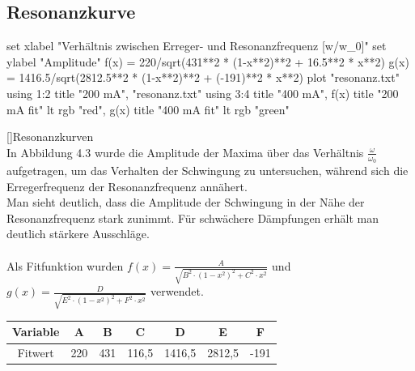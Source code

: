 \documentclass[12pt,a4paper,]{scrreprt}
\begin{document}
		\subsection{Resonanzkurve}
        
        \begin{gnuplot}[terminal=pdf,terminaloptions={font ",10" linewidth 3},scale=1.2]
        	set xlabel "Verhältnis zwischen Erreger- und Resonanzfrequenz [w/w_0]"
            set ylabel "Amplitude"
			f(x) = 220/sqrt(431**2 * (1-x**2)**2 + 16.5**2 * x**2)
            g(x) = 1416.5/sqrt(2812.5**2 * (1-x**2)**2 + (-191)**2 * x**2)
			plot "resonanz.txt" using 1:2 title "200 mA", "resonanz.txt" using 3:4 title "400 mA", f(x) title "200 mA fit" lt rgb "red", g(x) title "400 mA fit" lt rgb "green"
             
		\end{gnuplot}
        []{Resonanzkurven}
        \ \\
        In Abbildung 4.3 wurde die Amplitude der Maxima über das Verhältnis $\frac{\omega}{\omega_0}$ aufgetragen, um das Verhalten der Schwingung zu untersuchen, während sich die Erregerfrequenz der Resonanzfrequenz annähert.\\
        Man sieht deutlich, dass die Amplitude der Schwingung in der Nähe der Resonanzfrequenz stark zunimmt. Für schwächere Dämpfungen erhält man deutlich stärkere Ausschläge.\\
        \\ Als Fitfunktion wurden $f(x) =\frac{A}{\sqrt{B^2 \cdot (1-x^2)^2 + C^2 \cdot x^2}}$ und $g(x) =\frac{D}{\sqrt{E^2 \cdot (1-x^2)^2 + F^2 \cdot x^2}}$ verwendet.
        \begin{center}
        
        \begin{tabular}{c||c|c|c|c|c|c}
			Variable & A & B &C & D & E & F \\ \hline
            Fitwert &  220  & 431  & 116,5  &  1416,5 & 2812,5 & -191
        \end{tabular}
        
        \end{center}
\end{document}
